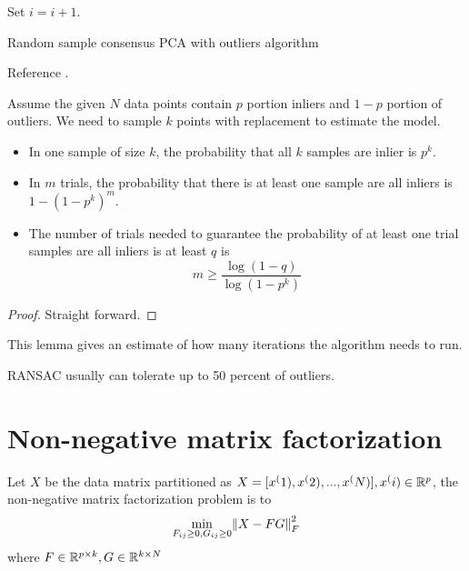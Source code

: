 \begin{refsection}
\begin{algorithm}[H]
{		Set $i=i+1.$\\
	}
	\caption{Random sample consensus PCA with outliers algorithm}
\end{algorithm}

\begin{remark}
	Reference \cite[107]{vidal2016generalized}.
\end{remark}

\begin{lemma}\cite[508]{vidal2016generalized}
Assume the given $N$ data points contain $p$ portion inliers and $1-p$ portion of outliers. We need to sample $k$ points with replacement to estimate the model.
\begin{itemize}
	\item In one sample of size $k$, the probability that all $k$ samples are inlier is $p^k$.
	\item In $m$ trials, the probability that there is at least one sample are all inliers is $1 - (1 - p^k)^m$.
	\item The number of trials needed to guarantee the probability of at least one trial samples are all inliers is at least $q$ is
	$$m\geq \frac{\log(1-q)}{\log(1-p^k)}$$
\end{itemize}
\end{lemma}
\begin{proof}
Straight forward.
\end{proof}

\begin{remark}[interpretation]
This lemma gives an estimate of how many iterations the algorithm needs to run.
\end{remark}

\begin{remark}
RANSAC usually can tolerate up to 50 percent of outliers.
\end{remark}






\section{Non-negative matrix factorization}

\begin{definition}\cite{lee1999learning}
Let $X$ be the data matrix partitioned as $X=[x^(1),x^(2),...,x^(N)],x^(i)\in \mathbb{R}^p$, the non-negative matrix factorization problem is to 
$$\min_{F_{ij}\geq 0, G_{ij}\geq 0} \norm{X-FG}^2_F$$
where $F\in \mathbb{R}^{p\times k}, G\in \mathbb{R}^{k\times N}$
\end{definition}


\end{refsection}
